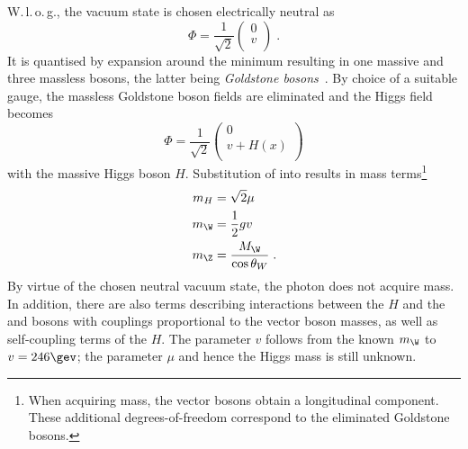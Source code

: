 W.\,l.\,o.\,g., the vacuum state is chosen electrically neutral as
\begin{equation*}
  \Phi = \frac{1}{\sqrt{2}}\begin{pmatrix} 0 \\ v \\ \end{pmatrix} \;.
\end{equation*} 
It is quantised by expansion around the minimum resulting in one massive and three massless bosons, the latter being \emph{Goldstone bosons}~\cite{PhysRev.127.965}.
By choice of a suitable gauge, the massless Goldstone boson fields are eliminated and the Higgs field becomes
\begin{equation}\label{eq:Theory:SM:EWSB:Phi}
  \Phi = \frac{1}{\sqrt{2}}\begin{pmatrix} 0 \\ v + H(x) \\ \end{pmatrix}
\end{equation}
with the massive Higgs boson $H$.
Substitution of  into  results in mass terms\footnote{When acquiring mass, the vector bosons obtain a longitudinal component. These additional degrees-of-freedom correspond to the eliminated Goldstone bosons.}
\begin{align*}
  \begin{split}
    m_{H}   & = \sqrt{2}\mu \\
    m_{\W}  & = \frac{1}{2}gv \\
    m_{\Z}  & = \frac{M_{\W}}{\cos\theta_{W}} \;.
  \end{split}
\end{align*} 
By virtue of the chosen neutral vacuum state, the photon does not acquire mass.
In addition, there are also terms describing interactions between the $H$ and the \W and \Z bosons with couplings proportional to the vector boson masses, as well as self-coupling terms of the $H$.
The parameter $v$ follows from the known $m_{\W}$ to \mbox{$v = 246\gev$}; the parameter $\mu$ and hence the Higgs mass is still unknown.

